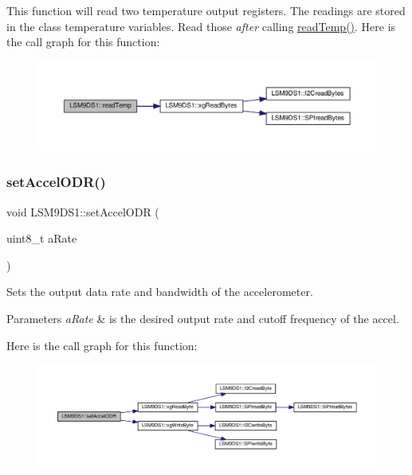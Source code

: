 This function will read two temperature output registers. The readings are stored in the class\textquotesingle{} temperature variables. Read those {\itshape after} calling \hyperlink{classLSM9DS1_aca21a51dc79a1287b97ed9c326e2080b}{read\+Temp()}. Here is the call graph for this function\+:
\nopagebreak
\begin{figure}[H]
\begin{center}
\leavevmode
\includegraphics[width=350pt]{classLSM9DS1_aca21a51dc79a1287b97ed9c326e2080b_cgraph}
\end{center}
\end{figure}
\mbox{\label{classLSM9DS1_a76d72839cdecc3f1c4ee6fff578182c5}} 
\subsubsection{\texorpdfstring{set\+Accel\+O\+D\+R()}{setAccelODR()}}
{\footnotesize\ttfamily void L\+S\+M9\+D\+S1\+::set\+Accel\+O\+DR (\begin{DoxyParamCaption}\item[{uint8\+\_\+t}]{a\+Rate }\end{DoxyParamCaption})}



Sets the output data rate and bandwidth of the accelerometer. 


\begin{DoxyParams}{Parameters}
{\em a\+Rate} & is the desired output rate and cutoff frequency of the accel. \\
\hline
\end{DoxyParams}
Here is the call graph for this function\+:
\nopagebreak
\begin{figure}[H]
\begin{center}
\leavevmode
\includegraphics[width=350pt]{classLSM9DS1_a76d72839cdecc3f1c4ee6fff578182c5_cgraph}
\end{center}
\end{figure}
\mbox{\label{classLSM9DS1_a8656d2de1ff9cc4cb76214e4561d02c4}} 
